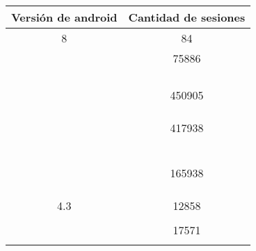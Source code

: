 \begin{table}[htbp]
\caption{}
\begin{tabular}{|c|l|}
\hline
\textbf{Versión de android} & \textbf{Cantidad de sesiones} \\ \hline
\multicolumn{ 1}{|c|}{8} & \multicolumn{1}{c|}{84} \\ \cline{ 2- 2}
\multicolumn{ 1}{|c|}{} & \multicolumn{ 1}{c|}{75886} \\ 
\multicolumn{ 1}{|c|}{} & \multicolumn{ 1}{l|}{} \\ 
\multicolumn{ 1}{|c|}{} & \multicolumn{ 1}{l|}{} \\ 
\multicolumn{ 1}{|c|}{} & \multicolumn{ 1}{l|}{} \\ 
\multicolumn{ 1}{|c|}{} & \multicolumn{ 1}{l|}{} \\ \cline{ 2- 2}
\multicolumn{ 1}{|c|}{} & \multicolumn{ 1}{c|}{450905} \\ 
\multicolumn{ 1}{|c|}{} & \multicolumn{ 1}{l|}{} \\ 
\multicolumn{ 1}{|c|}{} & \multicolumn{ 1}{l|}{} \\ 
\multicolumn{ 1}{|c|}{} & \multicolumn{ 1}{l|}{} \\ \cline{ 2- 2}
\multicolumn{ 1}{|c|}{} & \multicolumn{ 1}{c|}{417938} \\ 
\multicolumn{ 1}{|c|}{} & \multicolumn{ 1}{l|}{} \\ 
\multicolumn{ 1}{|c|}{} & \multicolumn{ 1}{l|}{} \\ 
\multicolumn{ 1}{|c|}{} & \multicolumn{ 1}{l|}{} \\ 
\multicolumn{ 1}{|c|}{} & \multicolumn{ 1}{l|}{} \\ 
\multicolumn{ 1}{|c|}{} & \multicolumn{ 1}{l|}{} \\ 
\multicolumn{ 1}{|c|}{} & \multicolumn{ 1}{l|}{} \\ \cline{ 2- 2}
\multicolumn{ 1}{|c|}{} & \multicolumn{ 1}{c|}{165938} \\ 
\multicolumn{ 1}{|c|}{} & \multicolumn{ 1}{l|}{} \\ 
\multicolumn{ 1}{|c|}{} & \multicolumn{ 1}{l|}{} \\ 
\multicolumn{ 1}{|c|}{} & \multicolumn{ 1}{l|}{} \\ \hline
\multicolumn{ 1}{|c|}{4.3} & \multicolumn{ 1}{c|}{12858} \\ 
\multicolumn{ 1}{|c|}{} & \multicolumn{ 1}{l|}{} \\ \cline{ 2- 2}
\multicolumn{ 1}{|c|}{} & \multicolumn{ 1}{c|}{17571} \\ 
\multicolumn{ 1}{|c|}{} & \multicolumn{ 1}{l|}{} \\ \cline{ 2- 2}

\end{tabular}
\end{table}
